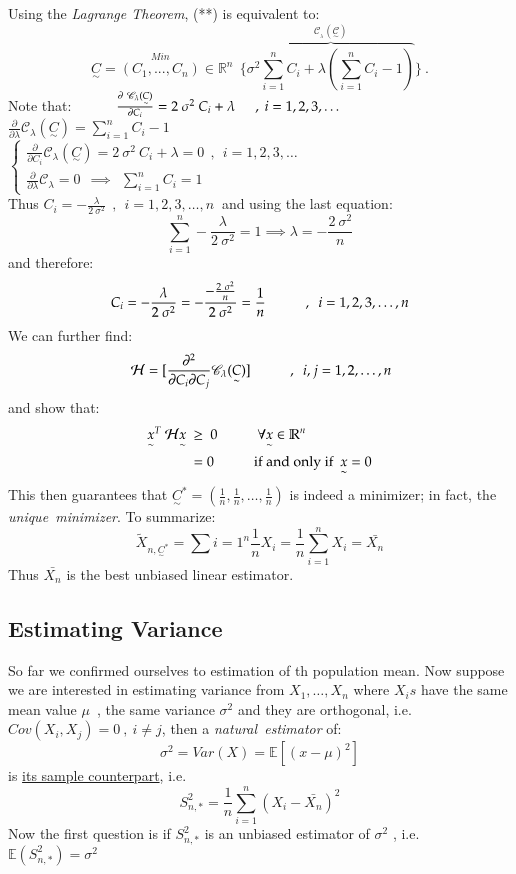 \documentclass[14pt,twoside,a4paper,fleqn]{article}
\theoremstyle{plain}
\begin{document}
Using the \emph{Lagrange Theorem}, (**) is equivalent to:
$$
\underset{\sim}{C} = \overset{Min}{(C_1,...,C_n)} \in\mathbb{R}^n\ \ \big\{\overbrace{\sigma^2\sum_{i=1}^n C_i + \lambda(\sum_{i=1}^n C_i -1)}^{\mathscr{C_{_\lambda} (\underset{\sim}{\text{C}})}}\big\}\ .
$$
Note that: 
$
\tab\frac{\partial\ \mathscr{C}_{\lambda}(\underset{\sim}{C})}{\partial C_i}
	= 2\ \sigma^2\ C_i + \lambda\tab[0.5cm] ,\ i=1,2,3,\ldots\\
$\\
$\frac{\partial}{\partial \lambda} \mathscr{C}_{\lambda}(\underset{\sim}{C})
	= \sum_{i=1}^n C_i - 1$\newline\\
$\begin{cases}
		\frac{\partial}{\partial C_i}\mathscr{C}_{\lambda}(\underset{\sim}{C})
			= 2\ \sigma^2\ C_i + \lambda = 0\ \ ,\ \ i=1,2,3,\ldots\\
		\frac{\partial}{\partial \lambda} \mathscr{C}_{\lambda} = 0\ \ \implies \ \ \sum_{i=1}^n C_i =1
		\end{cases}$\hfill\newline\\
Thus $C_i = -\frac{\lambda}{2\ \sigma^2}\ \ , \ \ i=1,2,3,\ldots,n\ $  and using the last equation:
$$
\sum_{i=1}^n -\frac{\lambda}{2\ \sigma^2} = 1 \implies \lambda = -\frac{2\ \sigma^2}{n}
$$
and therefore:
$$
C_i = -\frac{\lambda}{2\ \sigma^2} = -\frac{-\frac{2\ \sigma^2}{n}}{2\ \sigma^2} = \frac{1}{n}\tab ,\ \ i=1,2,3,\ldots,n
$$
We can further find:
$$\ \mathcal{H} = [\frac{\partial^2}{\partial C_i \partial C_j} \mathscr{C}_{\lambda}(\underset{\sim}{C})]\tab,\ \ i,j=1,2,\ldots,n$$
and show that:
\begin{equation*}
\begin{split}
\underset{\sim}{x}^T\ \mathcal{H}\underset{\sim}{x}\ &\geq\ 0\hspace*{1cm} \forall \underset{\sim}{x}\in\mathbb{R}^n\\
&=0\hspace*{1cm} \text{if and only if \ } \underset{\sim}{x} = 0
\end{split}
\end{equation*}
This then guarantees that ${\underset{\sim}{C}}^{*} = (\frac{1}{n},\frac{1}{n},\ldots,\frac{1}{n})$ is indeed a minimizer; in fact, the \mbox{\emph{unique minimizer}}. To summarize:
$$
\tilde{X}_{n,{\underset{\sim}{C}}^{*}} = \sum{i=1}^n \frac{1}{n} X_i = \frac{1}{n}\sum_{i=1}^n X_i = \bar{X_n}
$$
Thus $\bar{X_n}$ is the best unbiased linear estimator.
\subsection{Estimating Variance}
So far we confirmed ourselves to estimation of th population mean.\newline
Now suppose we are interested in estimating variance from $X_1,\ldots,X_n$ where $X_is$ have the same mean value $\mu$\ , the same variance $\sigma^2$ and they are orthogonal, i.e. \mbox{$Cov(X_i,X_j)=0\ ,\ i\neq j$}, then a \mbox{\emph{natural estimator}} of:
$$
\sigma^2 = Var(X) = \mathbb{E}[(x-\mu)^2]
$$
is \underline{its sample counterpart}, i.e.
$$
S_{n,*}^2 = \frac{1}{n} \sum_{i=1}^n (X_i - \bar{X_n})^2
$$
Now the first question is if $S_{n,*}^2$ is an unbiased estimator of $\sigma^2$ , i.e. $\mathbb{E}(S_{n,*}^2) = \sigma^2$
\end{document}

